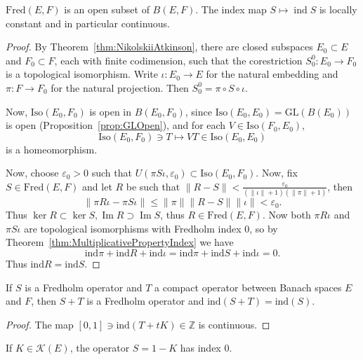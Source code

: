 \begin{theorem}
	\label{thm:ContinuityIndex}
	$\text{Fred}(E,F)$ is an open subset of $B(E,F)$. The index map $S \mapsto \operatorname{ind } S$ is locally constant and in particular continuous.
\end{theorem}
\begin{proof}
	By Theorem~\ref{thm:NikolskiiAtkinson}, there are closed subspaces $E_0 \subset E$ and $F_0 \subset F$, each with finite codimension, such that the corestriction $S_0^0: E_0 \to F_0$ is a topological isomorphism. Write $\iota : E_0 \to E$ for the natural embedding and $\pi : F \to F_0$ for the natural projection. Then $S_0^0 = \pi \circ S \circ \iota $. 

Now, $\text{Iso}(E_0, F_0)$ is open in $B(E_0, F_0)$, since $\text{Iso}(E_0, E_0) = \text{GL}(B(E_0))$ is open (Proposition~\ref{prop:GLOpen}), and for each $V \in \text{Iso}(F_0, E_0)$,
	 \[
		\text{Iso}(E_0, F_0) \ni T \mapsto VT \in \text{Iso}(E_0, E_0)
	\] 
	is a homeomorphism.

	Now, choose $\varepsilon_0>0$ such that $U(\pi S \iota, \varepsilon_0) \subset \text{Iso}(E_0, F_0) $. Now, fix $S \in \text{Fred}(E, F)$ and let $R$ be such that $\|R - S\| < \frac{\varepsilon_0}{(\|\iota\|+1)(\|\pi\|+1)}$, then
	\[
		\|\pi R \iota - \pi S \iota\|
		\le \|\pi\| \|R - S\| \|\iota\|
		< \varepsilon_0
	.\] 
	Thus  $\operatorname{ker} R \subset \operatorname{ker} S, \operatorname{Im} R \supset \operatorname{Im} S$, thus $R \in \text{Fred}(E, F)$. Now both $\pi R \iota$ and $\pi S \iota$ are topological isomorphisms with Fredholm index $0$, so by Theorem~\ref{thm:MultiplicativePropertyIndex} we have
	\[
		\text{ind}\pi + \text{ind}R + \text{ind}\iota =
		\text{ind}\pi + \text{ind}S + \text{ind}\iota = 0
	.\] 
	Thus $\text{ind} R = \text{ind} S$.
\end{proof}

\begin{corollary}
	\label{cor:CompactPerturbation}
	If $S$ is a Fredholm operator and $T$ a compact operator between Banach spaces $E$ and $F$, then $S + T$ is a Fredholm operator and $\text{ind}(S + T) = \text{ind}(S)$.
\end{corollary}
\begin{proof}
	The map $[0,1] \ni \text{ind}(T + t K) \in \mathbb{Z}$ is continuous.
\end{proof}

\begin{corollary}
	\label{cor:ITindex}
	If $K \in \mathcal{K}(E)$, the operator $S = 1 - K$ has index $0$.
\end{corollary}





